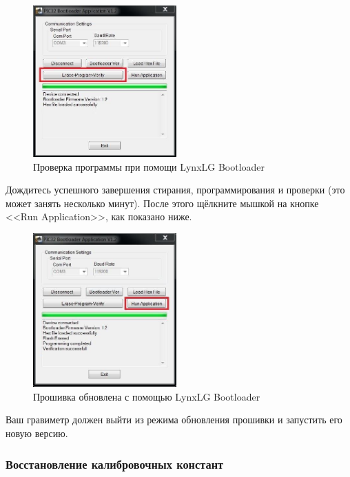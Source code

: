 \begin{figure}[H]
  \centering
  \includegraphics[width=0.49\textwidth]{figures/verifying_the_program_with_the_lynxlg_bootloader}
  \caption{Проверка программы при помощи LynxLG Bootloader}
  \label{fig:verifying_the_program_with_the_lynxlg_bootloader}
\end{figure}

Дождитесь успешного завершения стирания, программирования и проверки (это может
занять несколько минут). После этого щёлкните мышкой на кнопке <<Run
Application>>, как показано ниже.

\newpage
\begin{figure}[H]
  \centering
  \includegraphics[width=0.49\textwidth]{figures/upgrade_firmware_with_lynxlg_bootloader}
  \caption{Прошивка обновлена с помощью LynxLG Bootloader}
  \label{fig:upgrade_firmware_with_lynxlg_bootloader}
\end{figure}

Ваш гравиметр \cg{} должен выйти из режима обновления прошивки и запустить его новую версию.

\subsubsection{Восстановление калибровочных констант}

